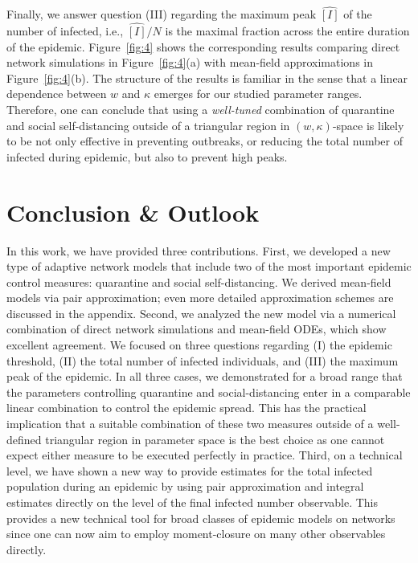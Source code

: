 \documentclass[12pt]{article}
\begin{document}
Finally, we answer question (III) regarding the maximum peak $\hat{[I]}$ of the number of infected, i.e., $\hat{[I]}/N$ is the maximal fraction across the entire duration of the epidemic. Figure~\ref{fig:4} shows the corresponding results comparing direct network simulations in Figure~\ref{fig:4}(a) with mean-field approximations in Figure~\ref{fig:4}(b). The structure of the results is familiar in the sense that a linear dependence between $w$ and $\kappa$ emerges for our studied parameter ranges. Therefore, one can conclude that using a \emph{well-tuned} combination of quarantine and social self-distancing outside of a triangular region in $(w,\kappa)$-space is likely to be not only effective in preventing outbreaks, or reducing the total number of infected during epidemic, but also to prevent high peaks.

\section{Conclusion \& Outlook}
\label{sec:conclusion}

In this work, we have provided three contributions. First, we developed a new type of adaptive network models that include two of the most important epidemic control measures: quarantine and social self-distancing. We derived mean-field models via pair approximation; even more detailed approximation schemes are discussed in the appendix. Second, we analyzed the new model via a numerical combination of direct network simulations and mean-field ODEs, which show excellent agreement. We focused on three questions regarding (I) the epidemic threshold, (II) the total number of infected individuals, and (III) the maximum peak of the epidemic. In all three cases, we demonstrated for a broad range that the parameters controlling quarantine and social-distancing enter in a comparable linear combination to control the epidemic spread. This has the practical implication that a suitable combination of these two measures outside of a well-defined triangular region in parameter space is the best choice as one cannot expect either measure to be executed perfectly in practice. Third, on a technical level, we have shown a new way to provide estimates for the total infected population during an epidemic by using pair approximation and integral estimates directly on the level of the final infected number observable. This provides a new technical tool for broad classes of epidemic models on networks since one can now aim to employ moment-closure on many other observables directly.\medskip
\end{document}
